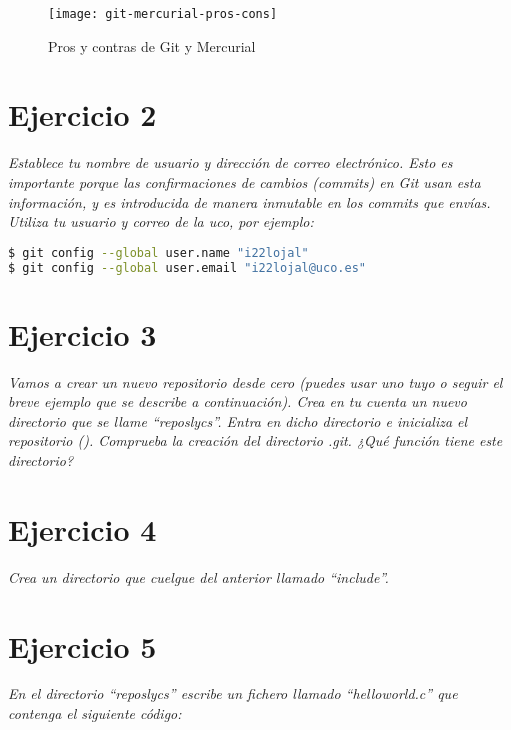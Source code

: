 \begin{figure}[H]
    \centering
    \texttt{[image: git-mercurial-pros-cons]}
    \caption{Pros y contras de Git y Mercurial\cite{intland_2015:Pros_Cons_Mercurial_Git}}
    \label{fig:git-mercurial-pros-cons}
\end{figure}


\section{Ejercicio 2}
\begin{center}
    \parbox{12cm}{\justify\textit{
        Establece tu nombre de usuario y dirección de correo electrónico. Esto es importante porque las confirmaciones de cambios (commits) en Git usan esta información, y es introducida de manera inmutable en los commits que envías. Utiliza tu usuario y correo de la uco, por ejemplo:}}
    \end{center}


\begin{lstlisting}[xleftmargin=.16\textwidth,language=bash]
$ git config --global user.name "i22lojal"
$ git config --global user.email "i22lojal@uco.es"
\end{lstlisting}


\section{Ejercicio 3}
\begin{center}
    \parbox{12cm}{\justify\textit{Vamos a crear un nuevo repositorio desde cero (puedes usar uno tuyo o seguir el breve ejemplo que se describe a continuación). Crea en tu cuenta un nuevo directorio que se llame “reposlycs”. Entra en dicho directorio e inicializa el repositorio (). Comprueba la creación del directorio .git. ¿Qué función tiene este directorio?
    }}
\end{center}


\section{Ejercicio 4}
\begin{center}
    \parbox{12cm}{\justify\textit{Crea un directorio que cuelgue del anterior llamado ``include''.
    }}
\end{center}

\section{Ejercicio 5}
\begin{center}
    \parbox{12cm}{\justify\textit{
        En el directorio ``reposlycs'' escribe un fichero llamado “helloworld.c” que contenga el siguiente código:
    }}
\end{center}


